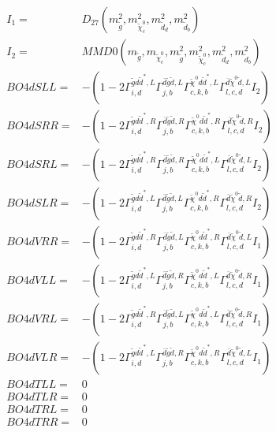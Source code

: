 \documentclass[A4,landscape]{article}
\begin{document}
\begin{align} 
I_1 = & D_{27}(m^2_{\tilde{g}}, m^2_{\tilde{\chi}^0_{{c}}}, m^2_{\tilde{d}_{{d}}}, m^2_{\tilde{d}_{{b}}}) \\ 
I_2 = & MMD0(m_{\tilde{g}}, m_{\tilde{\chi}^0_{{c}}}, m^2_{\tilde{g}}, m^2_{\tilde{\chi}^0_{{c}}}, m^2_{\tilde{d}_{{d}}}, m^2_{\tilde{d}_{{b}}}) \\ 
  BO4dSLL= & -(1
-
2 \Gamma^{\tilde{g} d \tilde{d}^*,L}_{i, d} \Gamma^{\bar{d}\tilde{g} \tilde{d} ,L}_{j, b} \Gamma^{\tilde{\chi}^0 d \tilde{d}^*,L}_{c, k, b} \Gamma^{\bar{d}\tilde{\chi}^0 \tilde{d} ,L}_{l, c, d} I_2) \\ 
  BO4dSRR= & -(1
-
2 \Gamma^{\tilde{g} d \tilde{d}^*,R}_{i, d} \Gamma^{\bar{d}\tilde{g} \tilde{d} ,R}_{j, b} \Gamma^{\tilde{\chi}^0 d \tilde{d}^*,R}_{c, k, b} \Gamma^{\bar{d}\tilde{\chi}^0 \tilde{d} ,R}_{l, c, d} I_2) \\ 
  BO4dSRL= & -(1
-
2 \Gamma^{\tilde{g} d \tilde{d}^*,R}_{i, d} \Gamma^{\bar{d}\tilde{g} \tilde{d} ,R}_{j, b} \Gamma^{\tilde{\chi}^0 d \tilde{d}^*,L}_{c, k, b} \Gamma^{\bar{d}\tilde{\chi}^0 \tilde{d} ,L}_{l, c, d} I_2) \\ 
  BO4dSLR= & -(1
-
2 \Gamma^{\tilde{g} d \tilde{d}^*,L}_{i, d} \Gamma^{\bar{d}\tilde{g} \tilde{d} ,L}_{j, b} \Gamma^{\tilde{\chi}^0 d \tilde{d}^*,R}_{c, k, b} \Gamma^{\bar{d}\tilde{\chi}^0 \tilde{d} ,R}_{l, c, d} I_2) \\ 
  BO4dVRR= & -(1
-
2 \Gamma^{\tilde{g} d \tilde{d}^*,R}_{i, d} \Gamma^{\bar{d}\tilde{g} \tilde{d} ,L}_{j, b} \Gamma^{\tilde{\chi}^0 d \tilde{d}^*,R}_{c, k, b} \Gamma^{\bar{d}\tilde{\chi}^0 \tilde{d} ,L}_{l, c, d} I_1) \\ 
  BO4dVLL= & -(1
-
2 \Gamma^{\tilde{g} d \tilde{d}^*,L}_{i, d} \Gamma^{\bar{d}\tilde{g} \tilde{d} ,R}_{j, b} \Gamma^{\tilde{\chi}^0 d \tilde{d}^*,L}_{c, k, b} \Gamma^{\bar{d}\tilde{\chi}^0 \tilde{d} ,R}_{l, c, d} I_1) \\ 
  BO4dVRL= & -(1
-
2 \Gamma^{\tilde{g} d \tilde{d}^*,R}_{i, d} \Gamma^{\bar{d}\tilde{g} \tilde{d} ,L}_{j, b} \Gamma^{\tilde{\chi}^0 d \tilde{d}^*,L}_{c, k, b} \Gamma^{\bar{d}\tilde{\chi}^0 \tilde{d} ,R}_{l, c, d} I_1) \\ 
  BO4dVLR= & -(1
-
2 \Gamma^{\tilde{g} d \tilde{d}^*,L}_{i, d} \Gamma^{\bar{d}\tilde{g} \tilde{d} ,R}_{j, b} \Gamma^{\tilde{\chi}^0 d \tilde{d}^*,R}_{c, k, b} \Gamma^{\bar{d}\tilde{\chi}^0 \tilde{d} ,L}_{l, c, d} I_1) \\ 
  BO4dTLL= & 0 \\ 
  BO4dTLR= & 0 \\ 
  BO4dTRL= & 0 \\ 
  BO4dTRR= & 0 \\ 
\end{align} 
\end{document}
